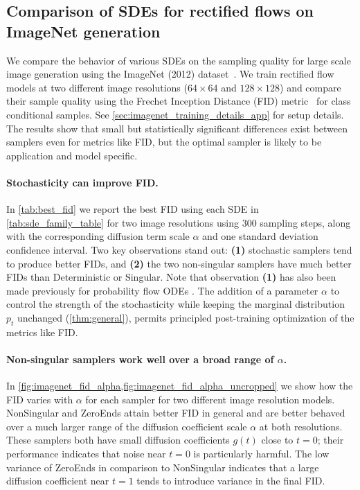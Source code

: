 \subsection{Comparison of SDEs for rectified flows on ImageNet generation}
\label{sec:imagenet_experiments}

We compare the behavior of various SDEs on the sampling quality for large scale image generation using the ImageNet (2012) dataset~\citep{deng2009imagenet,ILSVRC15}.
We train rectified flow models at two different image resolutions ($64 \times 64$ and $128 \times 128$) and compare their sample quality using the Frechet Inception Distance (FID) metric~\citep{heusel2017gans} for class conditional samples.
See \cref{sec:imagenet_training_details_app} for setup details.
The results show that small but statistically significant differences exist between samplers even for metrics like FID, but the optimal sampler is likely to be application and model specific.

\paragraph{Stochasticity can improve FID.}
In \cref{tab:best_fid} we report the best FID using each SDE in \cref{tab:sde_family_table} for two image resolutions using 300 sampling steps, along with the corresponding diffusion term scale $\alpha$ and one standard deviation confidence interval.
Two key observations stand out:
\textbf{(1)} stochastic samplers tend to produce better FIDs,
and \textbf{(2)} the two non-singular samplers have much better FIDs than Deterministic or Singular.
Note that observation \textbf{(1)} has also been made previously for probability flow ODEs \citep{song2020score}.
The addition of a parameter $\alpha$ to control the strength of the stochasticity while keeping the marginal distribution $p_t$ unchanged (\cref{thm:general}), permits principled post-training optimization of the metrics like FID.

\paragraph{Non-singular samplers work well over a broad range of $\alpha$.}
In \cref{fig:imagenet_fid_alpha,fig:imagenet_fid_alpha_uncropped} we show how the FID varies with $\alpha$ for each sampler for two different image resolution models.
NonSingular and ZeroEnds attain better FID in general and are better behaved over a much larger range of the diffusion coefficient scale $\alpha$ at both resolutions. 
These samplers both have small diffusion coefficients $g(t)$ close to $t=0$; their performance indicates that noise near $t=0$ is particularly harmful.
The low variance of ZeroEnds in comparison to NonSingular indicates that a large diffusion coefficient near $t=1$ tends to introduce variance in the final FID.

